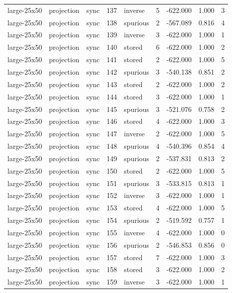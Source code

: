\begin{tabular}{lllrlrrrr}
large-25x50 & projection & sync & 137 & inverse & 5 & -622.000 & 1.000 & 3 \\
large-25x50 & projection & sync & 138 & spurious & 2 & -567.089 & 0.816 & 4 \\
large-25x50 & projection & sync & 139 & inverse & 3 & -622.000 & 1.000 & 1 \\
large-25x50 & projection & sync & 140 & stored & 6 & -622.000 & 1.000 & 2 \\
large-25x50 & projection & sync & 141 & stored & 2 & -622.000 & 1.000 & 5 \\
large-25x50 & projection & sync & 142 & spurious & 3 & -540.138 & 0.851 & 2 \\
large-25x50 & projection & sync & 143 & stored & 2 & -622.000 & 1.000 & 2 \\
large-25x50 & projection & sync & 144 & stored & 3 & -622.000 & 1.000 & 1 \\
large-25x50 & projection & sync & 145 & spurious & 3 & -521.076 & 0.758 & 2 \\
large-25x50 & projection & sync & 146 & stored & 4 & -622.000 & 1.000 & 3 \\
large-25x50 & projection & sync & 147 & inverse & 2 & -622.000 & 1.000 & 5 \\
large-25x50 & projection & sync & 148 & spurious & 4 & -540.396 & 0.854 & 4 \\
large-25x50 & projection & sync & 149 & spurious & 2 & -537.831 & 0.813 & 2 \\
large-25x50 & projection & sync & 150 & stored & 2 & -622.000 & 1.000 & 5 \\
large-25x50 & projection & sync & 151 & spurious & 3 & -533.815 & 0.813 & 1 \\
large-25x50 & projection & sync & 152 & inverse & 3 & -622.000 & 1.000 & 1 \\
large-25x50 & projection & sync & 153 & stored & 4 & -622.000 & 1.000 & 5 \\
large-25x50 & projection & sync & 154 & spurious & 2 & -519.592 & 0.757 & 1 \\
large-25x50 & projection & sync & 155 & inverse & 4 & -622.000 & 1.000 & 0 \\
large-25x50 & projection & sync & 156 & spurious & 2 & -546.853 & 0.856 & 0 \\
large-25x50 & projection & sync & 157 & stored & 7 & -622.000 & 1.000 & 3 \\
large-25x50 & projection & sync & 158 & stored & 3 & -622.000 & 1.000 & 2 \\
large-25x50 & projection & sync & 159 & inverse & 3 & -622.000 & 1.000 & 1 \\

\end{tabular}
